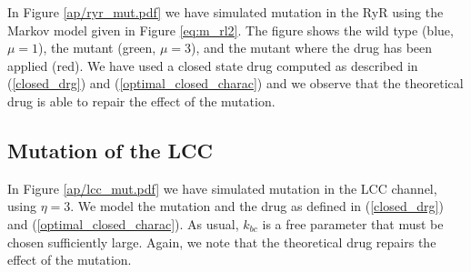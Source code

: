 In Figure \ref{ap/ryr_mut.pdf} we have simulated mutation in the RyR using the Markov model given in Figure \ref{eq:m_rl2}. The figure shows the
wild type (blue, $\mu=1$), the mutant (green, $\mu=3$), and the mutant where the drug has been applied (red). We have used a closed state drug  computed as described in (\ref{closed_drg}) and (\ref{optimal_closed_charac}) and we observe that the theoretical drug is able to repair the effect of the mutation. 





\subsection{Mutation of the LCC}

In Figure \ref{ap/lcc_mut.pdf} we have simulated mutation in the LCC channel, using $\eta=3$. 
We model the mutation and the drug as defined in (\ref{closed_drg}) and (\ref{optimal_closed_charac}). As usual, $k_{bc}$ is a free parameter that must be chosen sufficiently large. Again, we note that the theoretical drug repairs the effect of the mutation. 



